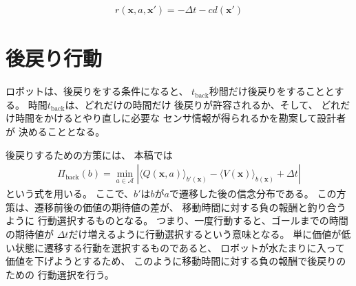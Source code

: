 \documentclass{jarticle}
\newcommand{\V}[1]{\boldsymbol{#1}}
\begin{document}
\begin{align}
	r(\V{x},a,\V{x}') = - \Delta t - c d(\V{x}')
\end{align}

\section{後戻り行動}

ロボットは、後戻りをする条件になると、
$t_\text{back}$秒間だけ後戻りをすることとする。
時間$t_\text{back}$は、どれだけの時間だけ
後戻りが許容されるか、そして、
どれだけ時間をかけるとやり直しに必要な
センサ情報が得られるかを勘案して設計者が
決めることとなる。

後戻りするための方策には、
本稿では
\begin{align}
	\Pi_\text{back}(b) = \min_{a \in \mathcal{A}} \left|\langle Q(\V{x},a) \rangle_{b'(\V{x})} - \langle V(\V{x}) \rangle_{b(\V{x})} + \Delta t \right|
\end{align}
という式を用いる。
ここで、$b'$は$b$が$a$で遷移した後の信念分布である。
この方策は、遷移前後の価値の期待値の差が、
移動時間に対する負の報酬と釣り合うように
行動選択するものとなる。
つまり、一度行動すると、ゴールまでの時間の期待値が
$\Delta t$だけ増えるように行動選択するという意味となる。
単に価値が低い状態に遷移する行動を選択するものであると、
ロボットが水たまりに入って価値を下げようとするため、
このように移動時間に対する負の報酬で後戻りのための
行動選択を行う。




\end{document}
